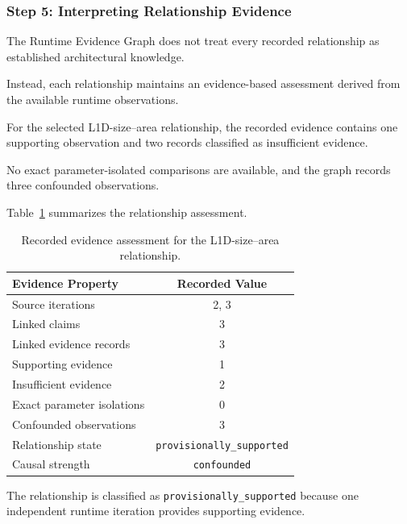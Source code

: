 
\subsubsection{Step 5: Interpreting Relationship Evidence}

The Runtime Evidence Graph does not treat
every recorded relationship as established
architectural knowledge.

Instead, each relationship maintains
an evidence-based assessment derived
from the available runtime observations.

For the selected L1D-size--area relationship,
the recorded evidence contains one
supporting observation and two records
classified as insufficient evidence.

No exact parameter-isolated comparisons
are available, and the graph records
three confounded observations.

Table~\ref{tab:app_v3_relationship_state}
summarizes the relationship assessment.

\begin{table}[htbp]
\centering
\caption{Recorded evidence assessment for
the L1D-size--area relationship.}
\label{tab:app_v3_relationship_state}
\renewcommand{\arraystretch}{1.15}
\small
\begin{tabular}{lc}
\toprule
\textbf{Evidence Property} &
\textbf{Recorded Value} \\
\midrule
Source iterations & 2, 3 \\
Linked claims & 3 \\
Linked evidence records & 3 \\
Supporting evidence & 1 \\
Insufficient evidence & 2 \\
Exact parameter isolations & 0 \\
Confounded observations & 3 \\
Relationship state &
\texttt{provisionally\_supported} \\
Causal strength &
\texttt{confounded} \\
\bottomrule
\end{tabular}
\end{table}

The relationship is classified as
\texttt{provisionally\_supported}
because one independent runtime iteration
provides supporting evidence.

